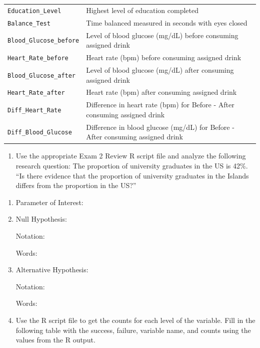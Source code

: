 \documentclass[
]{report}
\providecommand{\tightlist}{%
  \setlength{\itemsep}{0pt}\setlength{\parskip}{0pt}}
\begin{document}
\begin{longtable}[]{@{}
  >{\raggedright\arraybackslash}p{}
  >{\raggedright\arraybackslash}p{}@{}}
\texttt{Education\_Level} & Highest level of education completed \\
\texttt{Balance\_Test} & Time balanced measured in seconds with eyes closed \\
\texttt{Blood\_Glucose\_before} & Level of blood glucose (mg/dL) before consuming assigned drink \\
\texttt{Heart\_Rate\_before} & Heart rate (bpm) before consuming assigned drink \\
\texttt{Blood\_Glucose\_after} & Level of blood glucose (mg/dL) after consuming assigned drink \\
\texttt{Heart\_Rate\_after} & Heart rate (bpm) after consuming assigned drink \\
\texttt{Diff\_Heart\_Rate} & Difference in heart rate (bpm) for Before - After consuming assigned drink \\
\texttt{Diff\_Blood\_Glucose} & Difference in blood glucose (mg/dL) for Before - After consuming assigned drink \\
\bottomrule()
\end{longtable}

\newpage

\begin{enumerate}
\def\labelenumi{\arabic{enumi}.}
\tightlist
\item
  Use the appropriate Exam 2 Review R script file and analyze the following research question: The proportion of university graduates in the US is 42\%. ``Is there evidence that the proportion of university graduates in the Islands differs from the proportion in the US?''
\end{enumerate}

\begin{enumerate}
\def\labelenumi{\alph{enumi}.}
\item
  Parameter of Interest:
  \vspace{0.3in}
\item
  Null Hypothesis:

  Notation:
  \vspace{0.3in}

  Words:
  \vspace{0.5in}
\item
  Alternative Hypothesis:

  Notation:
  \vspace{0.3in}

  Words:
  \vspace{0.5in}
\item
  Use the R script file to get the counts for each level of the variable. Fill in the following table with the success, failure, variable name, and counts using the values from the R output.
\end{enumerate}
\end{document}
